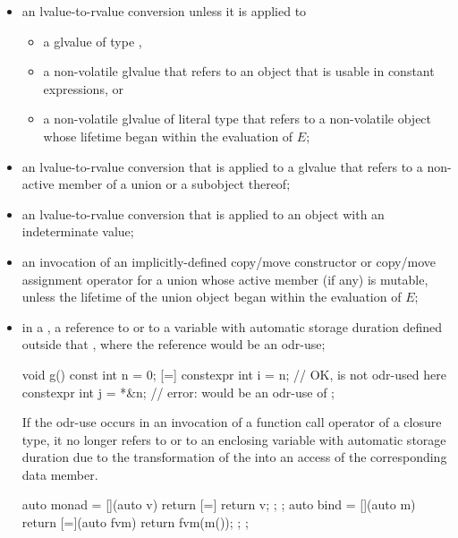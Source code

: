 \begin{itemize}
\item
an lvalue-to-rvalue conversion unless
it is applied to
\begin{itemize}
  \item
  a glvalue of type \cv {},

  \item
  a non-volatile glvalue that refers to an object that is
  usable in constant expressions, or

  \item
  a non-volatile glvalue of literal type that refers to a non-volatile object
  whose lifetime began within the evaluation of $E$;
\end{itemize}

\item
an lvalue-to-rvalue conversion
that is applied to a glvalue
that refers to a non-active member of a union or a subobject thereof;

\item
an lvalue-to-rvalue conversion that is applied to
an object with an indeterminate value;

\item
an invocation of an implicitly-defined copy/move constructor or
copy/move assignment operator
for a union whose active member (if any) is mutable,
unless the lifetime of the union object began within the evaluation of $E$;

\item
in a ,
a reference to  or to a variable with
automatic storage duration defined outside that
, where
the reference would be an odr-use;
\begin{example}
\begin{codeblock}
void g() {
  const int n = 0;
  [=] {
    constexpr int i = n;        // OK,  is not odr-used here
    constexpr int j = *&n;      // error:  would be an odr-use of 
  };
}
\end{codeblock}
\end{example}
\begin{note}
If the odr-use occurs in an invocation
of a function call operator of a closure type,
it no longer refers to  or to an enclosing
variable with automatic storage duration
due to the transformation
of the  into
an access of the corresponding data member.
\begin{example}
\begin{codeblock}
auto monad = [](auto v) { return [=] { return v; }; };
auto bind = [](auto m) {
  return [=](auto fvm) { return fvm(m()); };
};


\end{codeblock}
\end{example}
\end{note}
\end{itemize}
